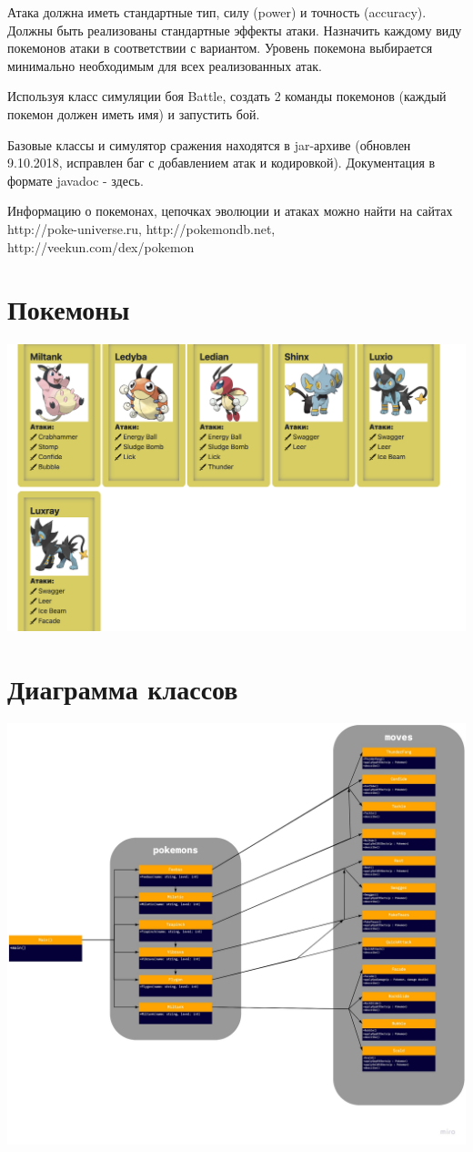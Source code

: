 \documentclass[12pt,onecolumn]{article}
\begin{document}
Атака должна иметь стандартные тип, силу (power) и точность (accuracy). Должны быть реализованы стандартные эффекты атаки. Назначить каждому виду покемонов атаки в соответствии с вариантом. Уровень покемона выбирается минимально необходимым для всех реализованных атак.

Используя класс симуляции боя Battle, создать 2 команды покемонов (каждый покемон должен иметь имя) и запустить бой.

Базовые классы и симулятор сражения находятся в jar-архиве (обновлен 9.10.2018, исправлен баг с добавлением атак и кодировкой). Документация в формате javadoc - здесь.

Информацию о покемонах, цепочках эволюции и атаках можно найти на сайтах http://poke-universe.ru, http://pokemondb.net, http://veekun.com/dex/pokemon
\section{Покемоны}
\includegraphics[scale=0.3]{pokemons.png}
\section{Диаграмма классов}
\includegraphics[scale=0.25]{UML.jpg}
\end{document}
